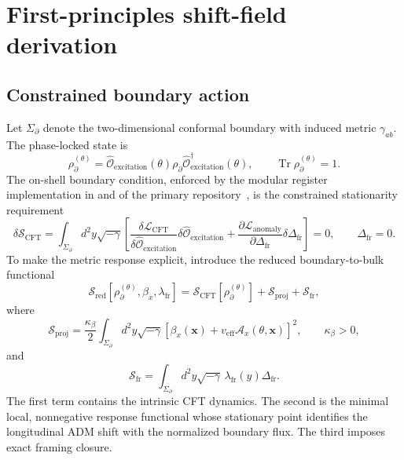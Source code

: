 \section{First-principles shift-field derivation}\label{sec:shift-derivation}

\subsection{Constrained boundary action}

Let \(\Sigma_\partial\) denote the two-dimensional conformal boundary with induced metric \(\gamma_{ab}\).  The phase-locked state is
\begin{equation}
  \rho_\partial^{(\theta)}
  =
  \widehat{\mathcal O}_{\mathrm{excitation}}(\theta)
  \rho_\partial
  \widehat{\mathcal O}_{\mathrm{excitation}}^\dagger(\theta),
  \qquad
  \operatorname{Tr}\rho_\partial^{(\theta)}=1.
  \label{eq:section3-excited-state}
\end{equation}
The on-shell boundary condition, enforced by the modular register implementation in  and  of the primary repository~\cite{shbt-precision}, is the constrained stationarity requirement
\begin{equation}
  \delta\mathcal S_{\mathrm{CFT}}
  =
  \int_{\Sigma_\partial}
  d^2y\sqrt{-\gamma}
  \left[
    \frac{\delta\mathcal L_{\mathrm{CFT}}}
    {\delta\widehat{\mathcal O}_{\mathrm{excitation}}}
    \delta\widehat{\mathcal O}_{\mathrm{excitation}}
    +
    \frac{\partial\mathcal L_{\mathrm{anomaly}}}
    {\partial\Delta_{\mathrm{fr}}}
    \delta\Delta_{\mathrm{fr}}
  \right]
  =
  0,
  \qquad
  \Delta_{\mathrm{fr}}=0.
  \label{eq:boundary-action-stationarity}
\end{equation}
To make the metric response explicit, introduce the reduced boundary-to-bulk functional
\begin{equation}
  \mathcal S_{\mathrm{red}}
  \left[
    \rho_\partial^{(\theta)},
    \beta_x,
    \lambda_{\mathrm{fr}}
  \right]
  =
  \mathcal S_{\mathrm{CFT}}
  \left[
    \rho_\partial^{(\theta)}
  \right]
  +
  \mathcal S_{\mathrm{proj}}
  +
  \mathcal S_{\mathrm{fr}},
  \label{eq:reduced-boundary-functional}
\end{equation}
where
\begin{equation}
  \mathcal S_{\mathrm{proj}}
  =
  \frac{\kappa_\beta}{2}
  \int_{\Sigma_\partial}
  d^2y\sqrt{-\gamma}
  \left[
    \beta_x(\boldsymbol{x})
    +
    v_{\mathrm{eff}}
    \mathcal A_x(\theta,\boldsymbol{x})
  \right]^2,
  \qquad
  \kappa_\beta>0,
  \label{eq:projection-action}
\end{equation}
and
\begin{equation}
  \mathcal S_{\mathrm{fr}}
  =
  \int_{\Sigma_\partial}
  d^2y\sqrt{-\gamma}\,
  \lambda_{\mathrm{fr}}(y)
  \Delta_{\mathrm{fr}}.
  \label{eq:framing-lagrange-term}
\end{equation}
The first term contains the intrinsic CFT dynamics.  The second is the minimal local, nonnegative response functional whose stationary point identifies the longitudinal ADM shift with the normalized boundary flux.  The third imposes exact framing closure.

